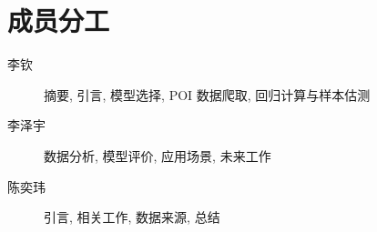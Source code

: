 \documentclass{iarticle}
\begin{document}
\tableofcontents
\listoffigures
\listoftables












\appendix
% 


\section{成员分工}
\begin{description}
  \item[李钦] 摘要, 引言, 模型选择, POI 数据爬取, 回归计算与样本估测
  \item[李泽宇] 数据分析, 模型评价, 应用场景, 未来工作
  \item[陈奕玮] 引言, 相关工作, 数据来源, 总结
\end{description}
\end{document}
